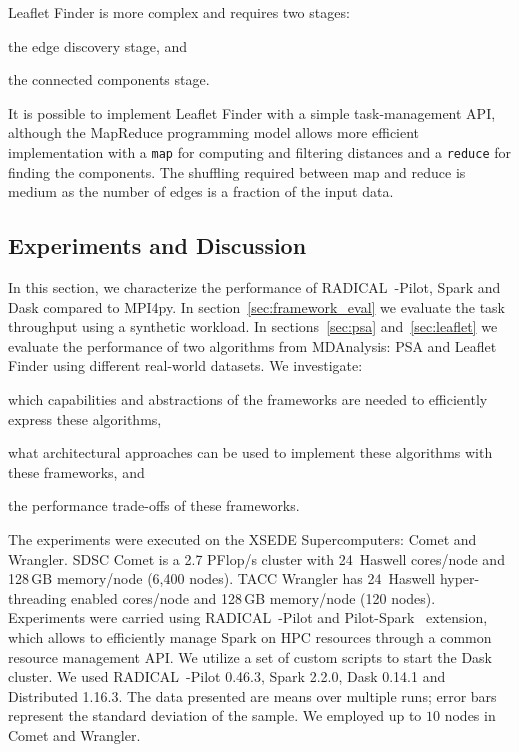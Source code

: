 Leaflet Finder is more complex and requires two stages:
\begin{inparaenum}[a)]
    \item the edge discovery stage, and
    \item the connected components stage.
\end{inparaenum}
It is possible to implement Leaflet Finder with a simple task-management API, although the MapReduce programming model allows more efficient implementation with a \texttt{map} for computing and filtering distances and a \texttt{reduce} for finding the components.
The shuffling required between map and reduce is medium as the number of edges is a fraction of the input data.

\subsection{Experiments and Discussion}
\label{impl_exp}
In this section, we characterize the performance of RADICAL~-Pilot, Spark and Dask compared to MPI4py.
In section~\ref{sec:framework_eval} we evaluate the task throughput using a synthetic workload.
In sections~\ref{sec:psa} and~\ref{sec:leaflet} we evaluate the performance of two algorithms from MDAnalysis: PSA and Leaflet Finder using different real-world datasets.
We investigate: 
\begin{inparaenum}[1)]
    \item which capabilities and abstractions of the frameworks are needed to efficiently express these algorithms,
    \item what architectural approaches can be used to implement these algorithms with these frameworks, and
    \item the performance trade-offs of these frameworks.
\end{inparaenum}

The experiments were executed on the XSEDE Supercomputers: Comet and Wrangler.
SDSC Comet is a 2.7 PFlop/s cluster with 24\, Haswell cores/node and 128\,GB memory/node (6,400 nodes).
TACC Wrangler has 24\, Haswell hyper-threading enabled cores/node and 128\,GB memory/node (120 nodes).
Experiments were carried using RADICAL~-Pilot and Pilot-Spark~\cite{luckow2016hadoop} extension, which allows to efficiently manage Spark on HPC resources through a common resource management API.
We utilize a set of custom scripts to start the Dask cluster.
We used RADICAL~-Pilot 0.46.3, Spark 2.2.0, Dask 0.14.1 and Distributed 1.16.3.
The data presented are means over multiple runs; error bars represent the standard deviation of the sample.
We employed up to $10$ nodes in Comet and Wrangler. 

